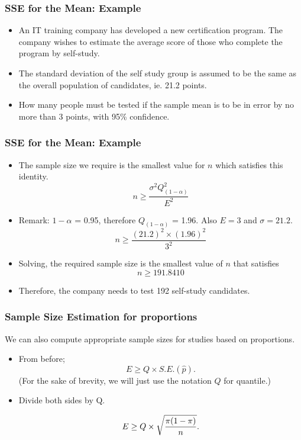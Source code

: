 \documentclass[a4]{beamer}
\begin{document}
\begin{frame}
\frametitle{SSE for the Mean: Example}

\begin{itemize}
\item An IT training company has developed a new certification program. The company wishes to estimate the average score of those who complete the program by self-study.  \item The standard deviation of the self study group is assumed to be the same as the overall population of candidates, ie. 21.2 points.
    \item How many people must be tested if the sample mean is to be in error by no more than 3 points, with 95\% confidence.
\end{itemize}
\end{frame}
\begin{frame}
\frametitle{SSE for the Mean: Example}

\begin{itemize}
\item The sample size we require is the smallest value for $n$ which satisfies this identity.
\[ n \geq \frac{\sigma^2 Q^2_{(1-\alpha)}}{E^2}  \]
\item Remark: $1-\alpha$ = 0.95, therefore $Q_{(1-\alpha)}$ = 1.96. Also $E=3$ and $\sigma =21.2$.
\[ n \geq \frac{(21.2)^2 \times (1.96)^2}{3^2} \]
\item Solving, the required sample size is the smallest value of $n$ that satisfies
\[ n \geq 191.8410 \]
\item Therefore, the company needs to test 192 self-study candidates.
\end{itemize}
\end{frame}

\begin{frame}
\frametitle{Sample Size Estimation for proportions}
We can also compute appropriate sample sizes for studies based on proportions.
\begin{itemize}
\item From before; \[ E \geq Q \times S.E.(\hat{p}). \]
(For the sake of brevity, we will just use the notation $Q$ for quantile.)

\item Divide both sides by Q.

\[ E \geq Q \times \sqrt{ {\pi(1-\pi)  \over n} }. \]

\end{itemize}
\end{frame}
\end{document}
